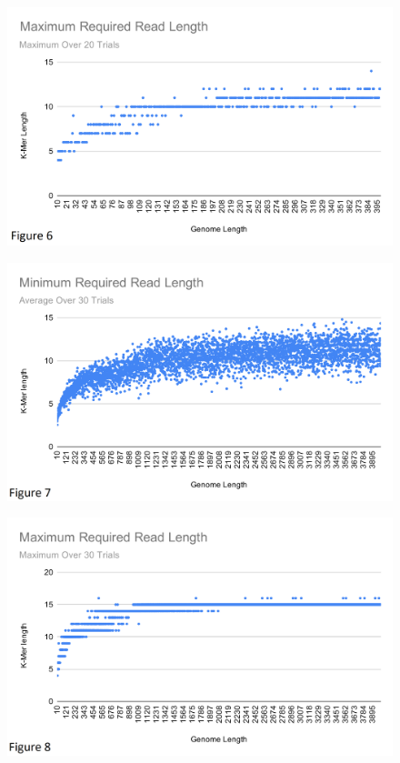 \documentclass[letterpaper, 10 pt]{ieeeconf}
\begin{document}
  \begin{figure}[thpb]
    \centering
    \includegraphics[scale=0.36]{images/Maximum_Required_Read_Length_(1).png}
    \label{fig6}
  \end{figure}

  \begin{figure}[thpb]
    \centering
    \includegraphics[scale=0.36]{images/Minimum_Required_Read_Length.png}
    \label{fig7}
  \end{figure}

  \begin{figure}[thpb]
    \centering
    \includegraphics[scale=0.36]{images/Maximum_Required_Read_Length.png}
    \label{fig8}
  \end{figure}
\end{document}
